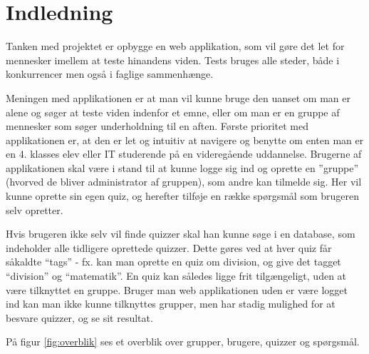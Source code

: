 \chapter{Indledning}
Tanken med projektet er opbygge en web applikation, som vil gøre det let for mennesker imellem at teste hinandens viden. Tests bruges alle steder, både i konkurrencer men også i faglige sammenhænge. 

Meningen med applikationen er at man vil kunne bruge den uanset om man er alene og søger at teste viden indenfor et emne, eller om man er en gruppe af mennesker som søger underholdning til en aften. 
Første prioritet med applikationen er, at den er let og intuitiv at navigere og benytte om enten man er en 4. klasses elev eller IT studerende på en videregående uddannelse. 
Brugerne af applikationen skal være i stand til at kunne logge sig ind og oprette en ''gruppe'' (hvorved de bliver administrator af gruppen), som andre kan tilmelde sig. Her vil kunne oprette sin egen quiz, og herefter tilføje en række spørgsmål som brugeren selv opretter. 

Hvis brugeren ikke selv vil finde quizzer skal han kunne søge i en database, som indeholder alle tidligere oprettede quizzer. Dette gøres ved at hver quiz får såkaldte “tags” - fx. kan man oprette en quiz om division, og give det tagget “division” og “matematik”. En quiz kan således ligge frit tilgængeligt, uden at være tilknyttet en gruppe. Bruger man web applikationen uden er være logget ind kan man ikke kunne tilknyttes grupper, men har stadig mulighed for at besvare quizzer, og se sit resultat.

På figur \ref{fig:overblik} ses et overblik over grupper, brugere, quizzer og spørgsmål.


